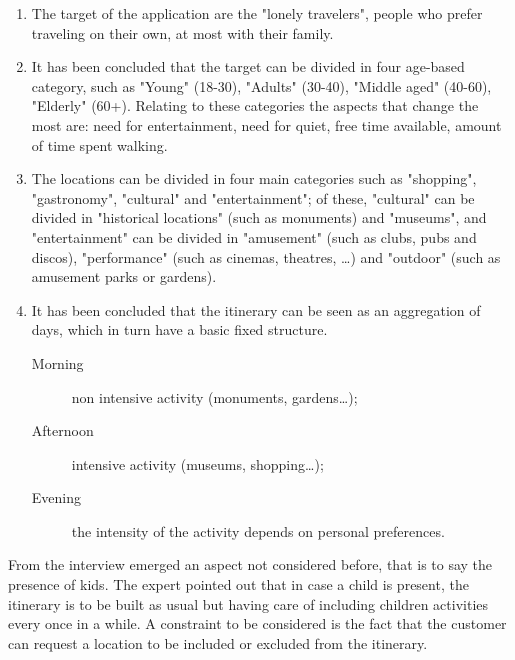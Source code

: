\documentclass[11pt]{article} %
\begin{document}
\begin{enumerate}
  \item The target of the application are the "lonely travelers", people who prefer traveling on their own, at most with their family.
  \item It has been concluded that the target can be divided in four age-based category, such as "Young" (18-30), "Adults" (30-40), "Middle aged" (40-60), "Elderly" (60+). Relating to these categories the aspects that change the most are: need for entertainment, need for quiet, free time available, amount of time spent walking.
  \item The locations can be divided in four main categories such as "shopping", "gastronomy", "cultural" and "entertainment"; of these, "cultural" can be divided in "historical locations" (such as monuments) and "museums", and "entertainment" can be divided in "amusement" (such as clubs, pubs and discos), "performance" (such as cinemas, theatres, \ldots)  and "outdoor" (such as amusement parks or gardens).
  \item It has been concluded that the itinerary can be seen as an aggregation of days, which in turn have a basic fixed structure. 
\begin{description}
  \item[Morning] non intensive activity (monuments, gardens\ldots);
  \item[Afternoon] intensive activity (museums, shopping\ldots);
  \item[Evening] the intensity of the activity depends on personal preferences.
\end{description}
\end{enumerate}

From the interview emerged an aspect not considered before, that is to say the presence of kids. The expert pointed out that in case a child is present, the itinerary is to be built as usual but having care of including children activities every once in a while.
A constraint to be considered is the fact that the customer can request a location to be included or excluded from the itinerary.
\end{document}
